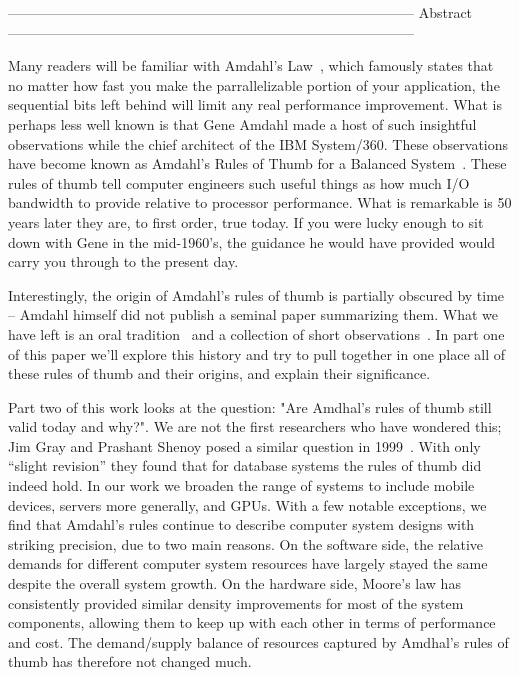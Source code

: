 ---------------------------------------------------------------------------------------
Abstract
---------------------------------------------------------------------------------------

Many readers will be familiar with Amdahl's Law~\cite{FIXME}, which famously states that no matter how fast you make the parrallelizable portion of your application, the sequential bits left behind will limit any real performance improvement.  What is perhaps less well known is that Gene Amdahl made a host of such insightful observations while the chief architect of the IBM System/360. These observations have become known as Amdahl's Rules of Thumb for a Balanced System~\cite{FIXME}.  These rules of thumb tell computer engineers such useful things as how much I/O bandwidth to provide relative to processor performance. What is remarkable is 50 years later they are, to first order, true today. If you were lucky enough to sit down with Gene in the mid-1960's, the guidance he would have provided would carry you through to the present day.

Interestingly, the origin of Amdahl's rules of thumb is partially obscured by time -- Amdahl himself did not publish a seminal paper summarizing them.  What we have left is an oral tradition~\cite{Amdahl-UMN-Interview} and a collection of short observations~\cite{FIXME}. In part one of this paper we'll explore this history and try to pull together in one place all of these rules of thumb and their origins, and explain their significance.

Part two of this work looks at the question: "Are Amdhal's rules of thumb still valid today and why?". We are not the first researchers who have wondered this; Jim Gray and Prashant Shenoy posed a similar question in 1999~\cite{FIXME}. With only ``slight revision'' they found that for database systems the rules of thumb did indeed hold. In our work we broaden the range of systems to include mobile devices, servers more generally, and GPUs. With a few notable exceptions, we find that Amdahl's rules continue to describe computer system designs with striking precision, due to two main reasons. On the software side, the relative demands for different computer system resources have largely stayed the same despite the overall system growth. On the hardware side, Moore's law has consistently provided similar density improvements for most of the system components, allowing them to keep up with each other in terms of performance and cost. The demand/supply balance of resources captured by Amdhal's rules of thumb has therefore not changed much.

